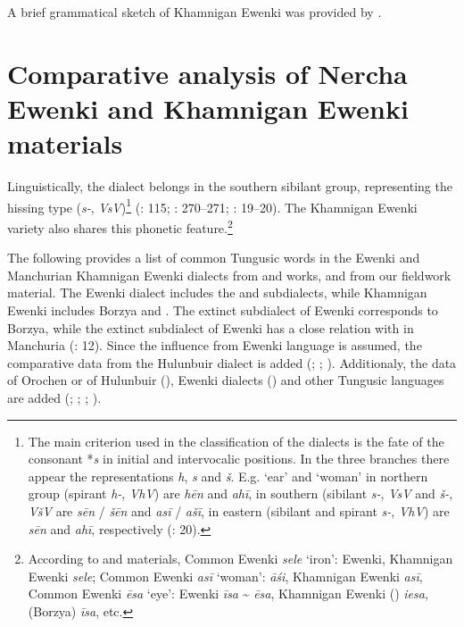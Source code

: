 \documentclass[output=paper,colorlinks,citecolor=brown]{langscibook}
\begin{document}
A brief grammatical sketch of Khamnigan Ewenki was provided by \citet{Janhunen1991}.


\section{Comparative analysis of Nercha Ewenki and Khamnigan Ewenki materials}

Linguistically, the  dialect belongs in the southern sibilant group, representing the hissing type (\textit{s-}, \textit{VsV})\footnote{The main criterion used in the classification of the dialects is the fate of the  consonant *\textit{s} in initial and intervocalic positions. In the three branches there appear the representations \textit{h}, \textit{s} and \textit{š}. E.g.  ‘ear’ and ‘woman’ in northern group (spirant \textit{h-}, \textit{VhV}) are \textit{hēn} and \textit{ahī}, in southern (sibilant \textit{s-}, \textit{VsV} and \textit{š-}, \textit{VšV} are \textit{sēn} / \textit{šēn} and \textit{asī} / \textit{ašī}, in eastern (sibilant and spirant \textit{s-}, \textit{VhV}) are \textit{sēn} and \textit{ahī}, respectively (\citealt{Khabtagaeva2017}: 20).} (\citealt{Atknine1997}: 115; \citealt{Bulatova2002}: 270--271; \citealt{Khabtagaeva2017}: 19--20). The Khamnigan Ewenki variety also shares this phonetic feature.\footnote{According to  and  materials, Common Ewenki \textit{sele} ‘iron’:  Ewenki, Khamnigan Ewenki \textit{sele}; Common Ewenki \textit{asī} ‘woman’:  \textit{āśi}, Khamnigan Ewenki \textit{asī}, Common Ewenki \textit{ēsa} ‘eye’:  Ewenki \textit{īsa} {\textasciitilde} \textit{ēsa}, Khamnigan Ewenki () \textit{iesa}, (Borzya) \textit{īsa}, etc.}

The following provides a list of common Tungusic words in the  Ewenki and Manchurian Khamnigan Ewenki dialects from  and  works, and from our fieldwork material. The  Ewenki dialect includes the  and  subdialects, while Khamnigan Ewenki includes Borzya and . The extinct  subdialect of  Ewenki corresponds to Borzya, while the extinct  subdialect of  Ewenki has a close relation with  in Manchuria (\citealt{Janhunen1991}: 12). Since the influence from  Ewenki language is assumed, the comparative data from the Hulunbuir  dialect is added (\citealt{Dorji1998}; \citeyear{Dorji2013}; \citealt{Chaoke2014bB}). Additionaly, the data of Orochen or  of Hulunbuir (\citealt{Chaoke2014a}),  Ewenki dialects (\citealt{Vasilevic1958}) and other Tungusic languages are added (\citealt{Cincius1975B}; \citealt{Hauer1952}; \citealt{Stary1990}; \citealt{Zikmundová2013a}).
\end{document}
